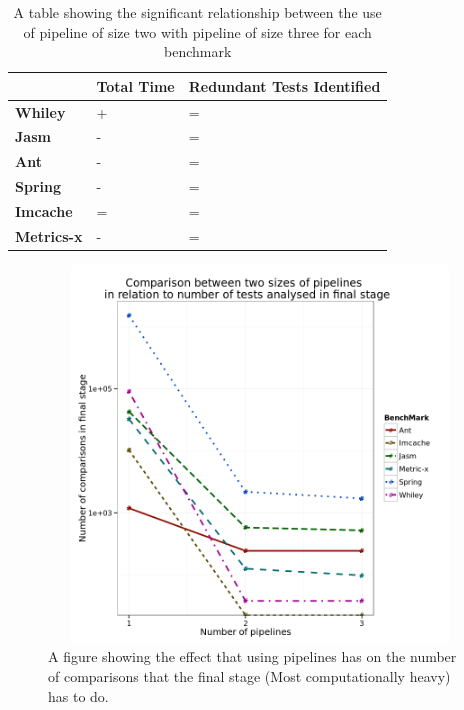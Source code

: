 \begin{table}[h]
\centering
\begin{tabular}{|l|l|l|}
\hline
{\bf }          & {\bf Total Time} & {\bf Redundant Tests Identified} \\ \hline
{\bf Whiley}    & +                & =                           \\ \hline
{\bf Jasm}      & -                & =                           \\ \hline
{\bf Ant}       & -                & =                           \\ \hline
{\bf Spring}    & -                & =                           \\ \hline
{\bf Imcache}   & =                & =                           \\ \hline
{\bf Metrics-x} & -                & =                           \\ \hline
\end{tabular}
\caption{A table showing the significant relationship between the use of pipeline of size two with pipeline of size three for each benchmark}
\label{pipelinesig}
\end{table}

\begin{figure}[h]
\begin{center}
\includegraphics[height=10cm, width = 14.5cm]{Pipeline.png}
\end{center}
\caption{A figure showing the effect that using pipelines has on the number of comparisons that the final stage (Most computationally heavy) has to do.}
\label{fig:pipelinegraph}
\end{figure}

